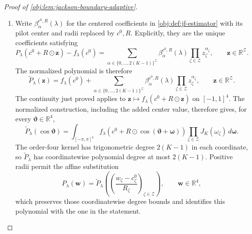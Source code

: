 \documentclass[11pt]{article}
\begin{document}
\begin{proof}[Proof of \cref{obj:lem:jackson-boundary-adaptive}]
\begin{enumerate}
Finally, \(x\mapsto[x]_+\) is one-Lipschitz. Applying this to the hinge in \cref{obj:def:dual-process} gives
\[
|f_\lambda(\mathbf w)-f_\lambda(\mathbf w')|
\leq
2|g_0(\mathbf w)-g_0(\mathbf w')|
+|g_1(\mathbf w)-g_1(\mathbf w')|
+|\lambda|\,|s(\mathbf w)-s(\mathbf w')|
\leq\Lambda_\epsilon\Delta(\mathbf w,\mathbf w').
\]
Since \(\Delta(\mathbf w,\mathbf w')\leq4\|\mathbf w-\mathbf w'\|_\infty\), \(f_\lambda\) is continuous on \(\mathcal R\). %

\item Write \(\beta_\alpha^{c^0,R}(\lambda)\) for the centered coefficients in \cref{obj:def:jf-estimator} with its pilot center and radii replaced by \(c^0,R\). Explicitly, they are the unique coefficients satisfying
\[
P_\lambda(c^0+R\odot\mathbf z)-f_\lambda(c^0)
=
\sum_{\alpha\in\{0,\ldots,2(K-1)\}^{\mathcal Z}}
\beta_\alpha^{c^0,R}(\lambda)
\prod_{\zeta\in\mathcal Z}z_\zeta^{\alpha_\zeta},
\qquad \mathbf z\in\mathbb R^{\mathcal Z}.
\]
The normalized polynomial is therefore
\[
\widetilde P_\lambda(\mathbf z)
=
f_\lambda(c^0)+
\sum_{\alpha\in\{0,\ldots,2(K-1)\}^{\mathcal Z}}
\beta_\alpha^{c^0,R}(\lambda)
\prod_{\zeta\in\mathcal Z}z_\zeta^{\alpha_\zeta},
\qquad \mathbf z\in\mathbb R^{\mathcal Z}.
\]
The continuity just proved applies to
\(\mathbf z\mapsto f_\lambda(c^0+R\odot\mathbf z)\) on \([-1,1]^4\).
The normalized construction, including the added center value, therefore gives, for every \(\boldsymbol\vartheta\in\mathbb R^4\),
\[
\widetilde P_\lambda(\cos\boldsymbol\vartheta)
=
\int_{[-\pi,\pi]^4}
f_\lambda\!\left(c^0+R\odot
\cos(\boldsymbol\vartheta+\boldsymbol\omega)\right)
\prod_{\zeta\in\mathcal Z}J_K(\omega_\zeta)
\,d\boldsymbol\omega.
\]
The order-four kernel has trigonometric degree \(2(K-1)\) in each coordinate, so \(\widetilde P_\lambda\) has coordinatewise polynomial degree at most \(2(K-1)\). Positive radii permit the affine substitution
\[
P_\lambda(\mathbf w)
=
\widetilde P_\lambda\!\left(
\left(\frac{w_\zeta-c^0_\zeta}{R_\zeta}\right)_{\zeta\in\mathcal Z}
\right),
\qquad \mathbf w\in\mathbb R^4,
\]
which preserves those coordinatewise degree bounds and identifies this polynomial with the one in the statement. %


\end{enumerate}
\end{proof}
\end{document}
